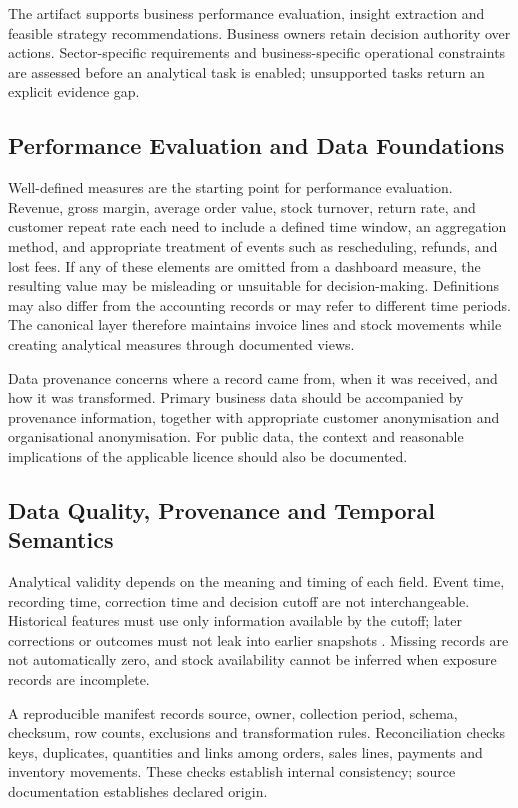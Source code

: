 \documentclass[a4paper,11pt,oneside]{book}
\theoremstyle{plain}
\theoremstyle{definition}
\theoremstyle{remark}
\begin{document}
The artifact supports business performance evaluation, insight extraction
and feasible strategy recommendations. Business owners retain decision authority over actions.
Sector-specific requirements and business-specific operational constraints are assessed before an
analytical task is enabled; unsupported tasks return an explicit evidence gap.


\subsection{Performance Evaluation and Data Foundations}

Well-defined measures are the starting point for performance evaluation. Revenue, gross margin, average order value, stock turnover, return rate, and customer repeat rate each need to include a defined time window, an aggregation method, and appropriate treatment of events such as rescheduling, refunds, and lost fees. If any of these elements are omitted from a dashboard measure, the
resulting value may be misleading or unsuitable for decision-making. Definitions may also differ from the accounting records or may refer to different time periods. The canonical layer therefore maintains invoice lines and stock movements while creating analytical measures through documented views.

Data provenance concerns where a record came from, when it was received, and how it was transformed. Primary business data should be accompanied by provenance information, together with appropriate customer anonymisation and organisational anonymisation. For public data, the context and reasonable implications of the applicable licence should also be documented.


\subsection{Data Quality, Provenance and Temporal Semantics}
Analytical validity depends on the meaning and timing of each field. Event
time, recording time, correction time and decision cutoff are not
interchangeable. Historical features must use only information available by
the cutoff; later corrections or outcomes must not leak into earlier
snapshots \cite{kaufman2012leakage}. Missing records are not automatically
zero, and stock availability cannot be inferred when exposure records are incomplete.

A reproducible manifest records source, owner, collection period, schema,
checksum, row counts, exclusions and transformation rules. Reconciliation
checks keys, duplicates, quantities and links among orders, sales lines,
payments and inventory movements. These checks establish internal
consistency; source documentation establishes declared origin.
\end{document}

